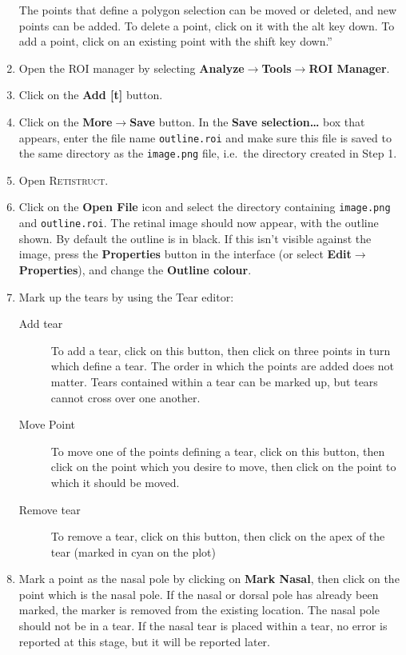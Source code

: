 \documentclass{article}
\begin{document}
\begin{enumerate}
  The points that define a polygon selection can be moved or deleted,
  and new points can be added. To delete a point, click on it with the
  alt key down. To add a point, click on an existing point with the
  shift key down.''
\item Open the ROI manager by selecting
\textbf{Analyze$\rightarrow$Tools$\rightarrow$ROI Manager}.
\item Click on the \textbf{Add [t]} button.
\item Click on the \textbf{More$\rightarrow$Save} button. In the \textbf{Save
selection\dots} box that appears, enter the file name
\texttt{outline.roi} and make sure this file is saved to the same
directory as the \texttt{image.png} file, i.e.\ the directory created
in Step 1.
\item Open \textsc{Retistruct}.
\item Click on the \textbf{Open File} icon and select the directory
containing \texttt{image.png} and \texttt{outline.roi}. The retinal
image should now appear, with the outline shown. By default the
outline is in black. If this isn't visible against the image, press
the \textbf{Properties} button in the interface (or select \textbf{Edit$\rightarrow$Properties}), and change the
\textbf{Outline colour}.
\item Mark up the tears by using the Tear editor:
  \begin{description}
\item[Add tear] To add a tear, click on this button, then click on
  three points in turn which define a tear. The order in which the
  points are added does not matter. Tears contained within a tear can
  be marked up, but tears cannot cross over one another.
\item[Move Point] To move one of the points defining a tear, click on
  this button, then click on the point which you desire to move, then
  click on the point to which it should be moved.
\item[Remove tear] To remove a tear, click on this button, then click
  on the apex of the tear (marked in cyan on the plot)
  \end{description}
\item Mark a point as the nasal pole by clicking on
  \textbf{Mark Nasal}, then click on the point which is the nasal
  pole.  If the nasal or dorsal pole has already been marked, the
  marker is removed from the existing location. The nasal pole should
  not be in a tear. If the nasal tear is placed within a tear, no
  error is reported at this stage, but it will be reported later.

\end{enumerate}
\end{document}
